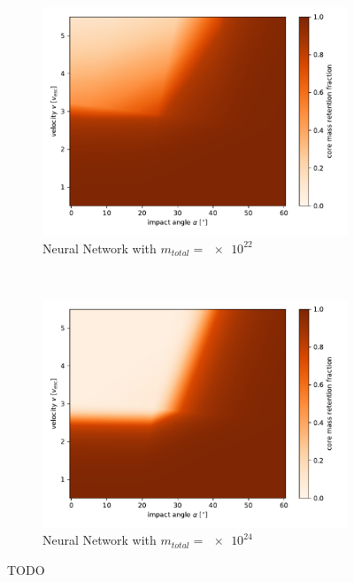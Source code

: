 \begin{figure}
\begin{subfigure}[t]{0.5\textwidth}
	\includegraphics[width=\linewidth]{images/plots/mass_nn1.pdf}
	\caption{Neural Network  with $m_{total}=\num{e22}$}
	\label{fig:mass_nn1}
\end{subfigure}%
~ 
\begin{subfigure}[t]{0.5\textwidth}
	\centering
	\includegraphics[width=\linewidth]{images/plots/mass_nn2.pdf}
	\caption{Neural Network  with $m_{total}=\num{e24}$}
	\label{fig:mass_nn2}
\end{subfigure}
	\caption{TODO}
	\label{fig:mass_results}
\end{figure}
